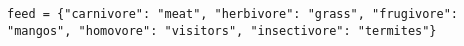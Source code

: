 \documentclass{article}[12pt]
\newcommand{\code}[1]{\texttt{#1}}  %
\begin{document}
\begin{enumerate}
	    \code{feed = \{"carnivore": "meat", "herbivore": "grass", "frugivore": "mangos", "homovore": "visitors", "insectivore": "termites"\} } \\


\end{enumerate}
\end{document}
